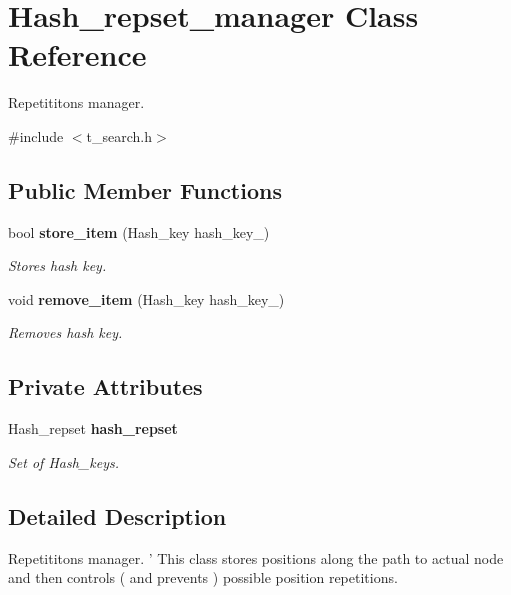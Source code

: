 \section{Hash\_\-repset\_\-manager Class Reference}
\label{classHash__repset__manager}


Repetititons manager.  




{\ttfamily \#include $<$t\_\-search.h$>$}

\subsection*{Public Member Functions}
\begin{DoxyCompactItemize}
\item 
bool {\bf store\_\-item} (Hash\_\-key hash\_\-key\_\-)
\begin{DoxyCompactList}\small\item\em Stores hash key. \item\end{DoxyCompactList}\item 
void {\bf remove\_\-item} (Hash\_\-key hash\_\-key\_\-)
\begin{DoxyCompactList}\small\item\em Removes hash key. \item\end{DoxyCompactList}\end{DoxyCompactItemize}
\subsection*{Private Attributes}
\begin{DoxyCompactItemize}
\item 
Hash\_\-repset {\bf hash\_\-repset}\label{classHash__repset__manager_a6338b741142b92c99a69eefd589897f3}

\begin{DoxyCompactList}\small\item\em Set of Hash\_\-keys. \item\end{DoxyCompactList}\end{DoxyCompactItemize}


\subsection{Detailed Description}
Repetititons manager. ' This class stores positions along the path to actual node and then controls ( and prevents ) possible position repetitions. 

